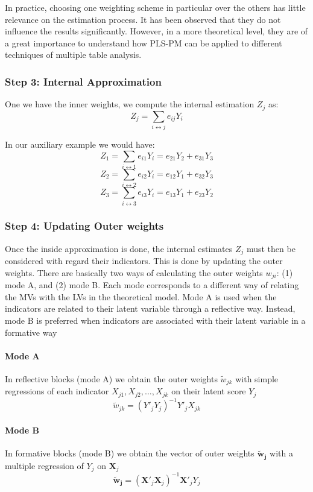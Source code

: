 \documentclass[12pt]{book}\usepackage{graphicx, color}
\begin{document}
\vspace{2mm}
In practice, choosing one weighting scheme in particular over the others has little relevance on the estimation process. It has been observed that they do not influence the results significantly. However, in a more theoretical level, they are of a great importance to understand how PLS-PM can be applied to different techniques of multiple table analysis.


\subsubsection*{Step 3: Internal Approximation}
One we have the inner weights, we compute the internal estimation $Z_j$ as:
$$ Z_j = \sum_{i \longleftrightarrow j} e_{ij} Y_i $$

In our auxiliary example we would have:
$$ Z_1 = \sum_{i \longleftrightarrow 1} e_{i1} Y_i = e_{21} Y_2 + e_{31} Y_3 $$
$$ Z_2 = \sum_{i \longleftrightarrow 2} e_{i2} Y_i = e_{12} Y_1 + e_{32} Y_3 $$
$$ Z_3 = \sum_{i \longleftrightarrow 3} e_{i3} Y_i = e_{13} Y_1 + e_{23} Y_2 $$



\subsubsection*{Step 4: Updating Outer weights}
Once the inside approximation is done, the internal estimates $Z_j$ must then be considered with regard their indicators. This is done by updating the outer weights. There are basically two ways of calculating the outer weights $w_{ji}$: (1) mode A, and (2) mode B. Each mode corresponds to a different way of relating the MVs with the LVs in the theoretical model. Mode A is used when the indicators are related to their latent variable through a reflective way. Instead, mode B is preferred when indicators are associated with their latent variable in a formative way

\paragraph{Mode A} In reflective blocks (mode A) we obtain the outer weights $\tilde{w}_{jk}$ with simple regressions of each indicator $X_{j1}, X_{j2}, \dots, X_{jk}$ on their latent score $Y_j$
$$ \tilde{w}_{jk}= (Y'_j Y_j)^{-1} Y'_j X_{jk} $$

\paragraph{Mode B} In formative blocks (mode B) we obtain the vector of outer weights $\mathbf{\tilde{w}_j} $ with a multiple regression of $Y_j$ on $\mathbf{X}_j$
$$ \mathbf{\tilde{w}_j} = (\mathbf{X}'_j \mathbf{X}_j)^{-1} \mathbf{X}'_j Y_j $$
\end{document}
